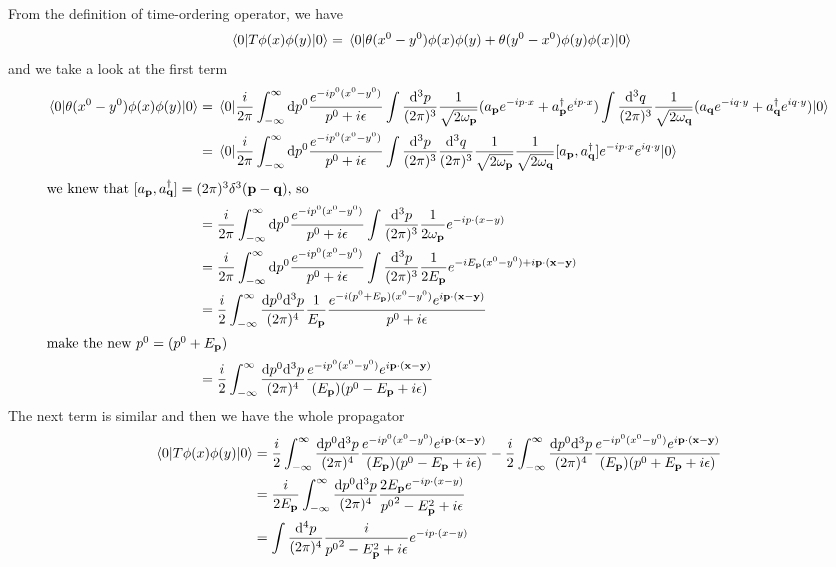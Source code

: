 \documentclass{article}
\newcommand{\vbp}{\vb{p}}
\begin{document}
From the definition of time-ordering operator, we have
\begin{align*}
  \mel{0}{T\phi(x)\phi(y)}{0}&=\mel{0}{\theta(x^0-y^0)\phi(x)\phi(y)+\theta(y^0-x^0)\phi(y)\phi(x)}{0}
\end{align*}
and we take a look at the first term
\begin{align*}
  \mel{0}{\theta(x^0-y^0)\phi(x)\phi(y)}{0}&=\mel{0}{\frac{i}{2\pi}\int_{-\infty}^{\infty}\dd p^0\frac{e^{-ip^0(x^0-y^0)}}{p^0+i\epsilon}\int\frac{\dd^3p}{(2\pi)^3}\frac{1}{\sqrt{2\omega_{\vb{p}}}}(a_{\vb{p}}e^{-ip\cdot x}+a_{\vb{p}}^{\dagger}e^{ip\cdot x})\int\frac{\dd^3q}{(2\pi)^3}\frac{1}{\sqrt{2\omega_{\vb{q}}}}(a_{\vb{q}}e^{-iq\cdot y}+a_{\vb{q}}^{\dagger}e^{iq\cdot y})}{0}\\
  &=\mel{0}{\frac{i}{2\pi}\int_{-\infty}^{\infty}\dd p^0\frac{e^{-ip^0(x^0-y^0)}}{p^0+i\epsilon}\int\frac{\dd^3p}{(2\pi)^3}\frac{\dd^3q}{(2\pi)^3}\frac{1}{\sqrt{2\omega_{\vb{p}}}}\frac{1}{\sqrt{2\omega_{\vb{q}}}}[a_{\vb{p}},a_{\vb{q}}^{\dagger}]e^{-ip\cdot x}e^{iq\cdot y}}{0}\\
  \intertext{we knew that $[a_{\vb{p}},a_{\vb{q}}^{\dagger}]=(2\pi)^3\delta^3(\vb{p-q})$, so}
  &=\frac{i}{2\pi}\int_{-\infty}^{\infty}\dd p^0\frac{e^{-ip^0(x^0-y^0)}}{p^0+i\epsilon}\int\frac{\dd^3p}{(2\pi)^3}\frac{1}{2\omega_{\vb{p}}}e^{-ip\cdot (x-y)}\\
  &=\frac{i}{2\pi}\int_{-\infty}^{\infty}\dd p^0\frac{e^{-ip^0(x^0-y^0)}}{p^0+i\epsilon}\int\frac{\dd^3p}{(2\pi)^3}\frac{1}{2E_{\vb{p}}}e^{-iE_{\vbp} (x^0-y^0)+i\vb{p\cdot(x-y)}}\\
  &=\frac{i}{2}\int_{-\infty}^{\infty}\frac{\dd p^0\dd^3p}{(2\pi)^4}\frac{1}{E_{\vb{p}}}\frac{e^{-i(p^0+E_{\vbp})(x^0-y^0)}e^{i\vb{p\cdot(x-y)}}}{p^0+i\epsilon}\\
  \intertext{make the new $p^0=(p^0+E_{\vbp})$}
  &=\frac{i}{2}\int_{-\infty}^{\infty}\frac{\dd p^0\dd^3p}{(2\pi)^4}\frac{e^{-ip^0(x^0-y^0)}e^{i\vb{p\cdot(x-y)}}}{(E_{\vbp})(p^0-E_{\vbp}+i\epsilon)}
\end{align*}
The next term is similar and then we have the whole propagator
\begin{align*}
  \mel{0}{T\phi(x)\phi(y)}{0}&=\frac{i}{2}\int_{-\infty}^{\infty}\frac{\dd p^0\dd^3p}{(2\pi)^4}\frac{e^{-ip^0(x^0-y^0)}e^{i\vb{p\cdot(x-y)}}}{(E_{\vbp})(p^0-E_{\vbp}+i\epsilon)}-\frac{i}{2}\int_{-\infty}^{\infty}\frac{\dd p^0\dd^3p}{(2\pi)^4}\frac{e^{-ip^0(x^0-y^0)}e^{i\vb{p\cdot(x-y)}}}{(E_{\vbp})(p^0+E_{\vbp}+i\epsilon)}\\
  & =\frac{i}{2E_{\vbp}}\int_{-\infty}^{\infty}\frac{\dd p^0\dd^3p}{(2\pi)^4}\frac{2E_{\vbp} e^{-ip\cdot{(x-y)}}}{{p^0}^2-E_{\vbp}^2+i\epsilon}\\
  &=\int\frac{\dd^4p}{(2\pi)^4}\frac{i}{{p^0}^2-E_{\vbp}^2+i\epsilon} e^{-ip\cdot{(x-y)}}
\end{align*}
\end{document}
